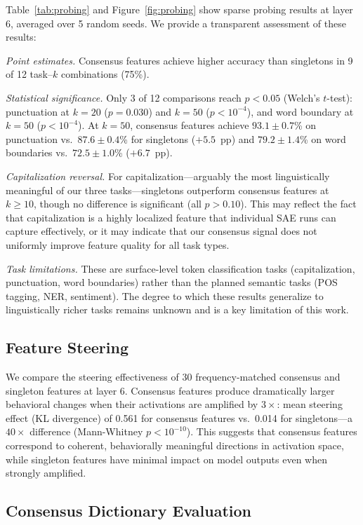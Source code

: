 \documentclass{article}
\begin{document}
Table~\ref{tab:probing} and Figure~\ref{fig:probing} show sparse probing results at layer 6, averaged over 5 random seeds. We provide a transparent assessment of these results:

\emph{Point estimates.} Consensus features achieve higher accuracy than singletons in 9 of 12 task--$k$ combinations (75\%).

\emph{Statistical significance.} Only 3 of 12 comparisons reach $p < 0.05$ (Welch's $t$-test): punctuation at $k = 20$ ($p = 0.030$) and $k = 50$ ($p < 10^{-4}$), and word boundary at $k = 50$ ($p < 10^{-4}$). At $k = 50$, consensus features achieve $93.1 \pm 0.7$\% on punctuation vs.\ $87.6 \pm 0.4$\% for singletons ($+5.5$~pp) and $79.2 \pm 1.4$\% on word boundaries vs.\ $72.5 \pm 1.0$\% ($+6.7$~pp).

\emph{Capitalization reversal.} For capitalization---arguably the most linguistically meaningful of our three tasks---singletons outperform consensus features at $k \geq 10$, though no difference is significant (all $p > 0.10$). This may reflect the fact that capitalization is a highly localized feature that individual SAE runs can capture effectively, or it may indicate that our consensus signal does not uniformly improve feature quality for all task types.

\emph{Task limitations.} These are surface-level token classification tasks (capitalization, punctuation, word boundaries) rather than the planned semantic tasks (POS tagging, NER, sentiment). The degree to which these results generalize to linguistically richer tasks remains unknown and is a key limitation of this work.

\subsection{Feature Steering}

We compare the steering effectiveness of 30 frequency-matched consensus and singleton features at layer 6. Consensus features produce dramatically larger behavioral changes when their activations are amplified by $3\times$: mean steering effect (KL divergence) of 0.561 for consensus features vs.\ 0.014 for singletons---a $40\times$ difference (Mann-Whitney $p < 10^{-10}$). This suggests that consensus features correspond to coherent, behaviorally meaningful directions in activation space, while singleton features have minimal impact on model outputs even when strongly amplified.

\subsection{Consensus Dictionary Evaluation}
\end{document}
